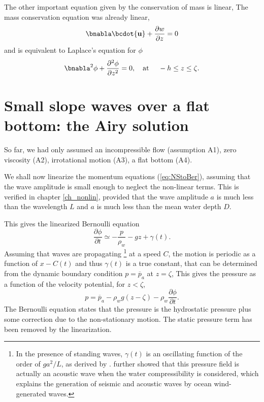 The other important equation given by the conservation of mass is linear, 
The mass conservation equation was already linear, 
\begin{equation}
\bnabla \bcdot {\mathbf u} + \frac{\partial w}{\partial z} =0
\end{equation}
and is equivalent to Laplace's equation for $\phi$
\begin{equation}
    \bnabla^2 \phi + \frac{\partial^2 \phi}{\partial z^2}=0,
    \quad \mbox{at\ }\quad -h\leq z \leq \zeta. \label{Laplace}
\end{equation}


\section{Small slope waves over a flat bottom: the Airy solution}
So far, we had only assumed an incompressible flow (assumption A1), zero viscosity (A2), 
irrotational motion (A3), a flat bottom (A4). 


We shall now linearize the momentum equations (\ref{eq:NStoBer}), assuming that the wave amplitude is small enough to 
neglect the non-linear terms. This is verified in chapter \ref{ch_nonlin}, provided that 
the wave amplitude $a$ is much less than the wavelength $L$ and $a$ is much less than the mean water depth $D$. 


This gives the linearized Bernoulli equation
\begin{equation}
    \frac{\partial \phi}{\partial t} \simeq 
       -\frac{p}{\rho_w}-g z + \gamma(t).\label{Bernoulli_lin}
\end{equation}
Assuming that waves are propagating \footnote{In the presence of standing waves, $\gamma(t)$ 
is an oscillating function of the order of $g a^2/L$, as derived by \cite{Miche1944d}.  \cite{Longuet-Higgins1950} further showed that this pressure field is actually an acoustic wave when the water compressibility is considered, which explains the generation of seismic and acoustic waves by ocean wind-generated waves.} at a speed $C$, the motion is periodic as a function of $x-C(t)$ and thus $\gamma(t)$ is a true constant, that can be determined from the dynamic boundary condition $p=\overline{p}_a$ at $z=\zeta$,
This gives the pressure as a function of the velocity potential, for $z< \zeta$, 
\begin{equation}
    p=\overline{p}_a -{\rho_w}g(z-\zeta) 
    -\rho_w \frac{\partial \phi}{\partial t}.\label{p_all}
\end{equation}
The Bernoulli equation states that the pressure is the hydrostatic pressure plus some correction 
due to the non-stationary motion. The static pressure term has been removed by the linearization. 

